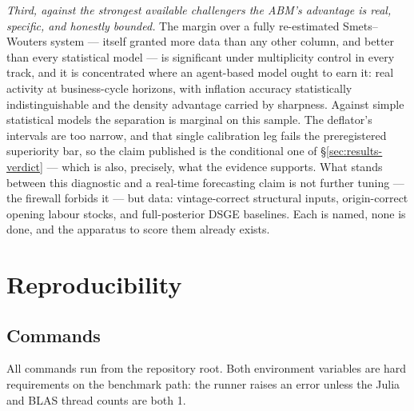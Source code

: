 \documentclass[11pt,a4paper]{article}
\begin{document}
\emph{Third, against the strongest available challengers the ABM's advantage is real, specific,
and honestly bounded.} The margin over a fully re-estimated Smets--Wouters system --- itself
granted more data than any other column, and better than every statistical model --- is
significant under multiplicity control in every track, and it is concentrated where an
agent-based model ought to earn it: real activity at business-cycle horizons, with inflation
accuracy statistically indistinguishable and the density advantage carried by sharpness. Against
simple statistical models the separation is marginal on this sample. The deflator's intervals
are too narrow, and that single calibration leg fails the preregistered superiority bar, so the
claim published is the conditional one of \S\ref{sec:results-verdict} --- which is also,
precisely, what the evidence supports. What stands between this diagnostic and a real-time
forecasting claim is not further tuning --- the firewall forbids it --- but data: vintage-correct
structural inputs, origin-correct opening labour stocks, and full-posterior DSGE baselines. Each
is named, none is done, and the apparatus to score them already exists.

\appendix
\section{Reproducibility}
\label{app:repro}

\subsection{Commands}

All commands run from the repository root. Both environment variables are hard requirements on the
benchmark path: the runner raises an error unless the Julia and BLAS thread counts are both 1.
\end{document}
